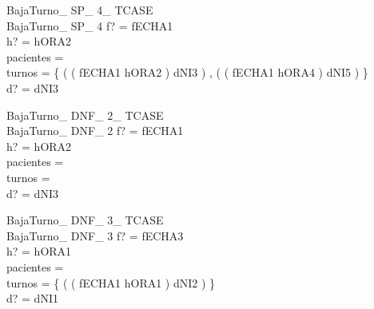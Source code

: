 \documentclass[12pt]{article}
\begin{document}
\begin{schema}{BajaTurno\_ SP\_ 4\_ TCASE}\\
 BajaTurno\_ SP\_ 4 
\where
 f? = fECHA1 \\
 h? = hORA2 \\
 pacientes =~\emptyset \\
 turnos = \{ ( ( fECHA1 \mapsto hORA2 ) \mapsto dNI3 ) , ( ( fECHA1 \mapsto hORA4 ) \mapsto dNI5 ) \} \\
 d? = dNI3
\end{schema}

\begin{schema}{BajaTurno\_ DNF\_ 2\_ TCASE}\\
 BajaTurno\_ DNF\_ 2 
\where
 f? = fECHA1 \\
 h? = hORA2 \\
 pacientes =~\emptyset \\
 turnos =~\emptyset \\
 d? = dNI3
\end{schema}

\begin{schema}{BajaTurno\_ DNF\_ 3\_ TCASE}\\
 BajaTurno\_ DNF\_ 3 
\where
 f? = fECHA3 \\
 h? = hORA1 \\
 pacientes =~\emptyset \\
 turnos = \{ ( ( fECHA1 \mapsto hORA1 ) \mapsto dNI2 ) \} \\
 d? = dNI1
\end{schema}
\end{document}

